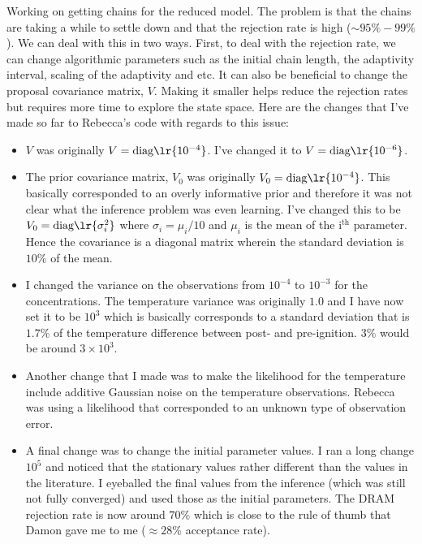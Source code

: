 




Working on getting chains for the reduced model.  The problem is that the chains are taking a while to settle down and that the rejection rate is high ($\sim 95\% - 99\%$).  We can deal with this in two ways.  First, to deal with the rejection rate, we can change algorithmic parameters such as the initial chain length, the adaptivity interval, scaling of the adaptivity and etc.  It can also be beneficial to change the proposal covariance matrix, $V$.  Making it smaller helps reduce the rejection rates but requires more time to explore the state space.  Here are the changes that I've made so far to Rebecca's code with regards to this issue:
\begin{itemize}
  \item $V$ was originally $V = \text{diag}\lr{10^{-4}}$.  I've changed it to $V = \text{diag}\lr{10^{-6}}$.
  \item The prior covariance matrix, $V_{0}$ was originally $V_{0} = \text{diag}\lr{10^{-4}}$.  This basically corresponded to an overly informative prior and therefore it was not clear what the inference problem was even learning.  I've changed this to be $V_{0} = \text{diag}\lr{\sigma_{i}^{2}}$ where $\sigma_{i} = \mu_{i}/10$ and $\mu_{i}$ is the mean of the $\text{i}^{\text{th}}$ parameter.  Hence the covariance is a diagonal matrix wherein the standard deviation is $10\%$ of the mean.
  \item I changed the variance on the observations from $10^{-4}$ to $10^{-3}$ for the concentrations.  The temperature variance was originally $1.0$ and I have now set it to be $10^{3}$ which is basically corresponds to a standard deviation that is $1.7\%$ of the temperature difference between post- and pre-ignition.  $3\%$ would be around $3\times 10^{3}$.
  \item Another change that I made was to make the likelihood for the temperature include additive Gaussian noise on the temperature observations.  Rebecca was using a likelihood that corresponded to an unknown type of observation error.
  \item A final change was to change the initial parameter values.  I ran a long change $10^{5}$ and noticed that the stationary values rather different than the values in the literature.  I eyeballed the final values from the inference (which was still not fully converged) and used those as the initial parameters.  The DRAM rejection rate is now around $70\%$ which is close to the rule of thumb that Damon gave me to me ($\approx 28\%$ acceptance rate).
\end{itemize} 


